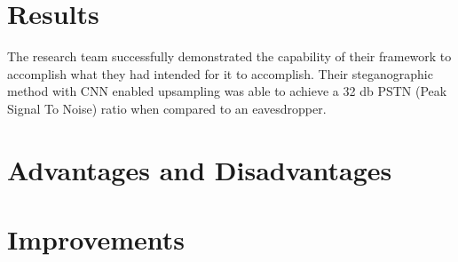 \documentclass[]{article}
\begin{document}
\section{Results}

The research team successfully demonstrated the capability of their framework to accomplish what they had intended for it to accomplish. Their steganographic method with CNN enabled upsampling was able to achieve a 32 db PSTN (Peak Signal To Noise) ratio when compared to an eavesdropper.

\section{Advantages and Disadvantages}





\section{Improvements}




\clearpage


\end{document}
